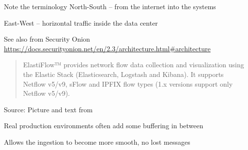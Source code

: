 \documentclass[Screen16to9,17pt]{foils}
\begin{document}
\begin{list2}
\item Note the terminology North-South -- from the internet into the systems
\item East-West -- horizontal traffic inside the data center
\item See also from Security Onion \url{https://docs.securityonion.net/en/2.3/architecture.html#architecture}
\end{list2}





\begin{quote}
  ElastiFlow™ provides network flow data collection and visualization using the Elastic Stack (Elasticsearch, Logstash and Kibana). It supports Netflow v5/v9, sFlow and IPFIX flow types (1.x versions support only Netflow v5/v9).
\end{quote}
Source: Picture and text from 


\begin{list2}
\item Real production environments often add some buffering in between
\item Allows the ingestion to become more smooth, no lost messages
\end{list2}
\end{document}
